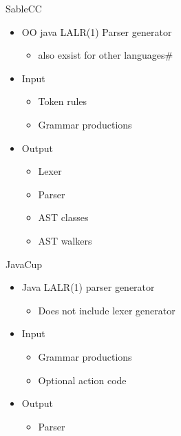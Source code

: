\begin{frame}{SableCC}
  \begin{itemize}
    \item OO java LALR(1) Parser generator
    \begin{itemize}
      \item also exsist for other languages\#
    \end{itemize}
    \item Input
    \begin{itemize}
      \item Token rules
      \item Grammar productions
    \end{itemize}
    \item Output
    \begin{itemize}
      \item Lexer
      \item Parser
      \item AST classes
      \item AST walkers
    \end{itemize}
  \end{itemize}
\end{frame}

\begin{frame}{JavaCup}
  \begin{itemize}
    \item Java LALR(1) parser generator
    \begin{itemize}
      \item Does not include lexer generator
    \end{itemize}
    \item Input
    \begin{itemize}
      \item Grammar productions
      \item Optional action code
    \end{itemize}
    \item Output
    \begin{itemize}
      \item Parser
    \end{itemize}
  \end{itemize}
\end{frame}

